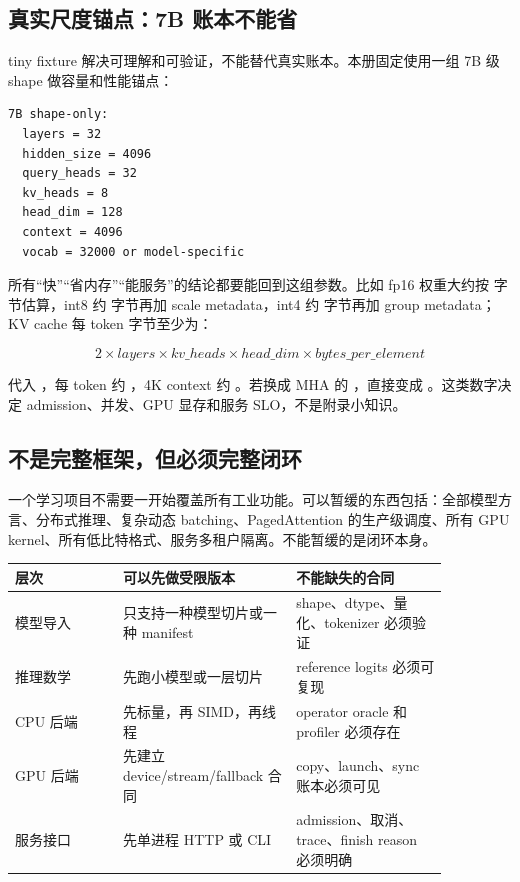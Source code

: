 \subsection{真实尺度锚点：7B 账本不能省}

tiny fixture 解决可理解和可验证，不能替代真实账本。本册固定使用一组 7B 级 shape 做容量和性能锚点：

\begin{lstlisting}[numbers=none,caption={7B shape-only fixture 固定参数}]
7B shape-only:
  layers = 32
  hidden_size = 4096
  query_heads = 32
  kv_heads = 8
  head_dim = 128
  context = 4096
  vocab = 32000 or model-specific
\end{lstlisting}

所有“快”“省内存”“能服务”的结论都要能回到这组参数。比如 fp16 权重大约按  字节估算，int8 约  字节再加 scale metadata，int4 约  字节再加 group metadata；KV cache 每 token 字节至少为：

\[
2 \times layers \times kv\_heads \times head\_dim \times bytes\_per\_element
\]

代入 ，每 token 约 ，4K context 约 。若换成 MHA 的 ，直接变成 。这类数字决定 admission、并发、GPU 显存和服务 SLO，不是附录小知识。

\subsection{不是完整框架，但必须完整闭环}

一个学习项目不需要一开始覆盖所有工业功能。可以暂缓的东西包括：全部模型方言、分布式推理、复杂动态 batching、PagedAttention 的生产级调度、所有 GPU kernel、所有低比特格式、服务多租户隔离。不能暂缓的是闭环本身。

\begin{center}
\begin{tabular}{p{0.22\linewidth}p{0.33\linewidth}p{0.31\linewidth}}
\toprule
层次 & 可以先做受限版本 & 不能缺失的合同 \\
\midrule
模型导入 & 只支持一种模型切片或一种 manifest & shape、dtype、量化、tokenizer 必须验证 \\
推理数学 & 先跑小模型或一层切片 & reference logits 必须可复现 \\
CPU 后端 & 先标量，再 SIMD，再线程 & operator oracle 和 profiler 必须存在 \\
GPU 后端 & 先建立 device/stream/fallback 合同 & copy、launch、sync 账本必须可见 \\
服务接口 & 先单进程 HTTP 或 CLI & admission、取消、trace、finish reason 必须明确 \\
\bottomrule
\end{tabular}
\end{center}

